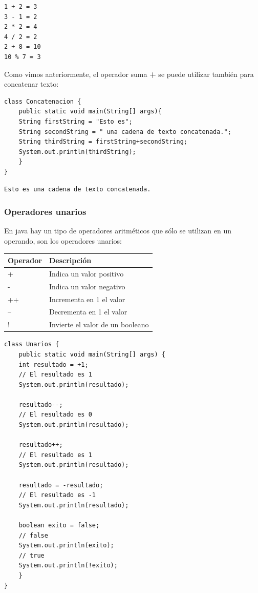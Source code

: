 \documentclass[11pt]{article}
\begin{document}
\begin{verbatim}
1 + 2 = 3
3 - 1 = 2
2 * 2 = 4
4 / 2 = 2
2 + 8 = 10
10 % 7 = 3
\end{verbatim}

Como vimos anteriormente, el operador suma \textbf{+} se puede utilizar también para concatenar texto:

\begin{verbatim}
class Concatenacion {
    public static void main(String[] args){
	String firstString = "Esto es";
	String secondString = " una cadena de texto concatenada.";
	String thirdString = firstString+secondString;
	System.out.println(thirdString);
    }
}
\end{verbatim}

\begin{verbatim}
Esto es una cadena de texto concatenada.
\end{verbatim}


\subsubsection{Operadores unarios}
\label{sec:org7a994f3}
En java hay un tipo de operadores aritméticos que sólo se utilizan en un operando, son los operadores unarios:
\begin{center}
\begin{tabular}{ll}
Operador & Descripción\\
\hline
+ & Indica un valor positivo\\
- & Indica un valor negativo\\
++ & Incrementa en 1 el valor\\
-- & Decrementa en 1 el valor\\
! & Invierte el valor de un booleano\\
\end{tabular}
\end{center}

\begin{verbatim}
class Unarios {
    public static void main(String[] args) {
	int resultado = +1;
	// El resultado es 1
	System.out.println(resultado);

	resultado--;
	// El resultado es 0
	System.out.println(resultado);

	resultado++;
	// El resultado es 1
	System.out.println(resultado);

	resultado = -resultado;
	// El resultado es -1
	System.out.println(resultado);

	boolean exito = false;
	// false
	System.out.println(exito);
	// true
	System.out.println(!exito);
    }
}
\end{verbatim}
\end{document}
